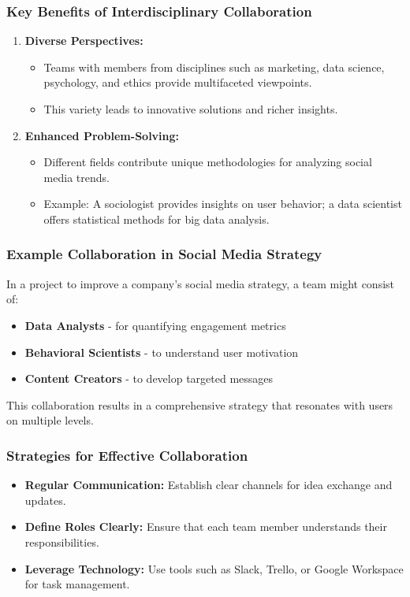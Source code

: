 \documentclass{beamer}
\begin{document}
\begin{frame}[fragile]
    \frametitle{Key Benefits of Interdisciplinary Collaboration}
    \begin{enumerate}
        \item \textbf{Diverse Perspectives:}
            \begin{itemize}
                \item Teams with members from disciplines such as marketing, data science, psychology, and ethics provide multifaceted viewpoints.
                \item This variety leads to innovative solutions and richer insights.
            \end{itemize}
        
        \item \textbf{Enhanced Problem-Solving:}
            \begin{itemize}
                \item Different fields contribute unique methodologies for analyzing social media trends.
                \item Example: A sociologist provides insights on user behavior; a data scientist offers statistical methods for big data analysis.
            \end{itemize}
    \end{enumerate}
\end{frame}

\begin{frame}[fragile]
    \frametitle{Example Collaboration in Social Media Strategy}
    In a project to improve a company’s social media strategy, a team might consist of:
    \begin{itemize}
        \item \textbf{Data Analysts} - for quantifying engagement metrics
        \item \textbf{Behavioral Scientists} - to understand user motivation
        \item \textbf{Content Creators} - to develop targeted messages
    \end{itemize}
    This collaboration results in a comprehensive strategy that resonates with users on multiple levels.
\end{frame}

\begin{frame}[fragile]
    \frametitle{Strategies for Effective Collaboration}
    \begin{itemize}
        \item \textbf{Regular Communication:} Establish clear channels for idea exchange and updates.
        \item \textbf{Define Roles Clearly:} Ensure that each team member understands their responsibilities.
        \item \textbf{Leverage Technology:} Use tools such as Slack, Trello, or Google Workspace for task management.
    \end{itemize}
\end{frame}
\end{document}
